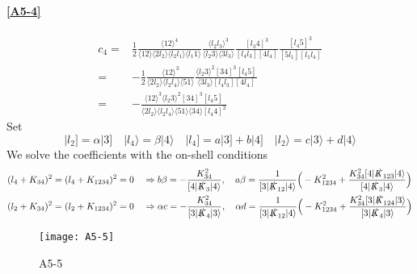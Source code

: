 \paragraph{\ref{A5-4}}
\begin{equation*}
\begin{split}
c_4 = & \frac{1}{2}\frac{\langle 12 \rangle^4}{\langle 12 \rangle\langle 2l_2 \rangle\langle l_2 l_1 \rangle\langle l_1 1 \rangle}
\frac{\langle l_2 l_3 \rangle^3}{\langle l_2 3 \rangle \langle 3 l_3 \rangle}
\frac{[l_3 4 ]^3}{[l_4 l_3][4 l_4]}
\frac{[l_4 5]^3}{[5l_1][l_1 l_4]}
\\
= &
-\frac{1}{2}\frac{\langle 12 \rangle^3}{\langle 2l_2\rangle\langle l_2 l_4 \rangle\langle 51 \rangle}
\frac{\langle l_2 3 \rangle^2 [34]^3 [l_4 5]}{\langle 3 l_3 \rangle [l_4 l_3][4 l_4]}
\\
= &
-\frac{\langle 12 \rangle^3\langle l_2 3\rangle^2[34]^3[l_4 5]}{\langle 2 l_2 \rangle\langle l_2 l_4 \rangle\langle 51 \rangle\langle 34 \rangle [l_4 4]^2}
\end{split}
\end{equation*}
Set
\begin{equation*}
|l_2] = \alpha|3] \quad
|l_4\rangle = \beta|4\rangle \quad
|l_4] = a|3] + b|4] \quad
|l_2\rangle = c|3\rangle + d|4\rangle
\end{equation*}
We solve the coefficients with the on-shell conditions
\begin{equation*}
\begin{split}
& (l_4 + K_{34})^2 = (l_4 +K_{1234})^2 = 0 \quad\Rightarrow
b\beta = -\frac{K_{34}^2}{[4|\slashed{K}_3|4\rangle} ,\quad
a\beta = \frac{1}{[3|\slashed{K}_{12}|4\rangle}\Big( -K_{1234}^2 + \frac{K_{34}^2 [4|\slashed{K}_{123}|4\rangle}{[4|\slashed{K}_3|4\rangle}\Big)
\\
&
(l_2 + K_{34})^2 = (l_2 + K_{1234})^2 = 0 \quad\Rightarrow
\alpha c = -\frac{K_{34}^2}{[3|\slashed{K}_4|3\rangle} ,\quad
\alpha d = \frac{1}{[3|\slashed{K}_{12}|4\rangle}\Big(-K_{1234}^2 + \frac{K_{34}^2 [3|\slashed{K}_{124}|3\rangle}{[3|\slashed{K}_4|3\rangle}\Big)
\end{split}
\end{equation*}
%
%
%
\begin{figure}
  \centering
    \texttt{[image: A5-5]}
    \caption{A5-5}
  \label{A5-5}
\end{figure}
